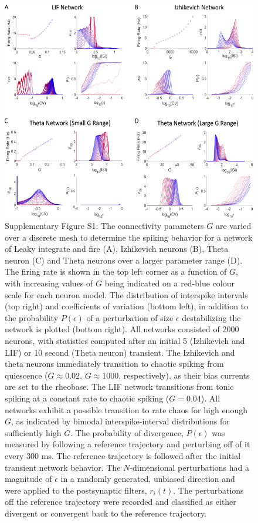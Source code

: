 \documentclass[11pt]{article} %
\begin{document}
\clearpage
\begin{figure}[htp!]
\centering
\includegraphics[scale=0.9]{FFIGS2}
\caption*{Supplementary Figure S1:  The connectivity parameters $G$ are varied over a discrete mesh to determine the spiking behavior for a network of Leaky integrate and fire (A), Izhikevich neurons (B), Theta neuron (C) and Theta neurons over a larger parameter range (D).  The firing rate is shown in the top left corner as a function of $G$, with increasing values of $G$ being indicated on a red-blue colour scale for each neuron model.  The distribution of interspike intervals (top right) and coefficients of variation (bottom left), in addition to the probability $P(\epsilon)$ of a perturbation of size $\epsilon$ destabilizing the network is plotted (bottom right).  All networks consisted of 2000 neurons, with statistics computed after an initial 5 (Izhikevich and LIF) or 10 second (Theta neuron) transient. The Izhikevich and theta neurons immediately transition to chaotic spiking from quiescence ($G\approx 0.02$, $G\approx 1000$, respectively), as their bias currents are set to the rheobase.  The LIF network transitions from tonic spiking at a constant rate to chaotic spiking ($G=0.04$).  All networks exhibit a possible transition to rate chaos for high enough $G$, as indicated by bimodal interspike-interval distributions for sufficiently high $G$.  The probability of divergence, $P(\epsilon)$ was measured by following a reference trajectory and perturbing off of it every 300 ms. The reference trajectory is followed after the initial transient network behavior.   The $N$-dimensional perturbations had a magnitude of $\epsilon$ in a randomly generated, unbiased direction and were applied to the postsynaptic filters, $r_i(t)$.  The perturbations off the reference trajectory were recorded and classified as either divergent or convergent back to the reference trajectory.}  
\end{figure}
\end{document}
